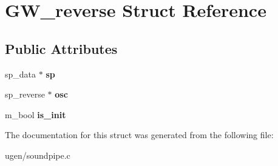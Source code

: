 \hypertarget{structGW__reverse}{}\section{G\+W\+\_\+reverse Struct Reference}
\label{structGW__reverse}
\subsection*{Public Attributes}
\begin{DoxyCompactItemize}
\item 
\hypertarget{structGW__reverse_aef608771705820fb7d37c817d41aa14e}{}\label{structGW__reverse_aef608771705820fb7d37c817d41aa14e} 
sp\+\_\+data $\ast$ {\bfseries sp}
\item 
\hypertarget{structGW__reverse_aaf0f33cf0de9ef6319db404caaf99041}{}\label{structGW__reverse_aaf0f33cf0de9ef6319db404caaf99041} 
sp\+\_\+reverse $\ast$ {\bfseries osc}
\item 
\hypertarget{structGW__reverse_ac8ee184e37d2450c2a3b05b9a4cfe86d}{}\label{structGW__reverse_ac8ee184e37d2450c2a3b05b9a4cfe86d} 
m\+\_\+bool {\bfseries is\+\_\+init}
\end{DoxyCompactItemize}


The documentation for this struct was generated from the following file\+:\begin{DoxyCompactItemize}
\item 
ugen/soundpipe.\+c\end{DoxyCompactItemize}

